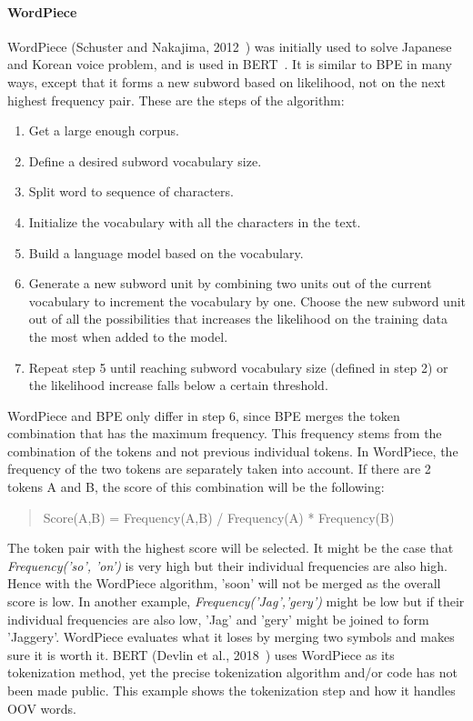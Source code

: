 \paragraph{WordPiece}\label{subsubsec:wordpiece}

WordPiece (Schuster and Nakajima, 2012~\cite{schuster2012japanese}) was initially used to solve Japanese and Korean voice problem, and is used in BERT~\cite{devlin2018bert}. It is similar to BPE in many ways, except that it forms a new subword based on likelihood, not on the next highest frequency pair. These are the steps of the algorithm:

\begin{enumerate}
    \item Get a large enough corpus.
    \item Define a desired subword vocabulary size.
    \item Split word to sequence of characters.
    \item Initialize the vocabulary with all the characters in the text.
    \item Build a language model based on the vocabulary.
    \item Generate a new subword unit by combining two units out of the current vocabulary to increment the vocabulary by one. Choose the new subword unit out of all the possibilities that increases the likelihood on the training data the most when added to the model.
    \item Repeat step 5 until reaching subword vocabulary size (defined in step 2) or the likelihood increase falls below a certain threshold.
\end{enumerate}

WordPiece and BPE only differ in step 6, since BPE merges the token combination that has the maximum frequency. This frequency stems from the combination of the tokens and not previous individual tokens. In WordPiece, the frequency of the two tokens are separately taken into account. If there are 2 tokens A and B, the score of this combination will be the following:

\begin{quote}
    Score(A,B) = Frequency(A,B) / Frequency(A) * Frequency(B)
\end{quote}

The token pair with the highest score will be selected. It might be the case that \textit{Frequency('so', 'on')} is very high but their individual frequencies are also high. Hence with the WordPiece algorithm, 'soon' will not be merged as the overall score is low. In another example, \textit{Frequency('Jag','gery')} might be low but if their individual frequencies are also low, 'Jag' and 'gery' might be joined to form 'Jaggery'. WordPiece evaluates what it loses by merging two symbols and makes sure it is worth it. BERT (Devlin et al., 2018~\cite{devlin2018bert}) uses WordPiece as its tokenization method, yet the precise tokenization algorithm and/or code has not been made public. This example shows the tokenization step and how it handles OOV words.

